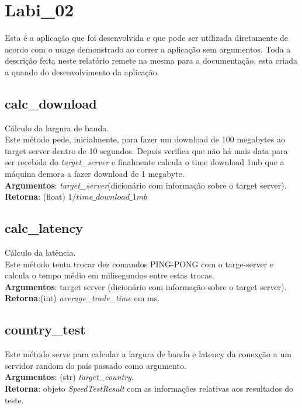 \documentclass{report}
\begin{document}
\section{Labi\_02}
\hspace{5mm}Esta é a aplicação que foi desenvolvida e que pode ser utilizada diretamente de acordo com o usage demonstrado ao correr a aplicação sem argumentos. Toda a descrição feita neste relatório remete na mesma para a documentação, esta criada a quando do desenvolvimento da aplicação.

\subsection{calc\_download}
\hspace{5mm}Cálculo da largura de banda.\\
Este método pede, inicialmente, para fazer um download de 100 megabytes ao target server dentro de 10 segundos. Depois verifica que não há mais data para ser recebida do \textit{target\_server} e finalmente calcula o time download 1mb que a máquina demora a fazer download de 1 megabyte.\\ 
\hspace{5mm}\textbf{Argumentos}: \textit{target\_server}(dicionário com informação sobre o target server). 
\hspace{5mm}\textbf{Retorna}: (float) $1/\textit{time\_download\_1mb}$

\subsection{calc\_latency}
\hspace{5mm}Cálculo da latência.\\ 
Este método tenta trocar dez comandos PING-PONG com o targe-server e calcula o tempo médio em milisegundos entre estas trocas.\\
\hspace{5mm}\textbf{Argumentos}: target server (dicionário com informação sobre o target server). 
\hspace{5mm}\textbf{Retorna}:(int) \textit{average\_trade\_time} em ms.

\subsection{country\_test}
\label{subsec.countrytest}
\hspace{5mm}Este método serve para calcular a largura de banda e latency da conexção a um servidor random do país passado como argumento.\\ 
\hspace{5mm}\textbf{Argumentos}: (str) \textit{target\_country}.\\
\textbf{Retorna}: objeto \textit{SpeedTestResult} com as informações relativas aos resultados do teste.
\end{document}
